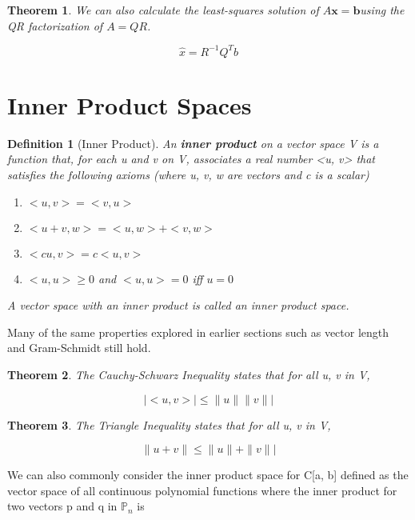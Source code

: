 \documentclass[12pt]{report}
\newtheorem{thm}{Theorem}
\newtheorem{dfn}{Definition}
\newcommand{\mateq}{$A\bm{x}=\bm{b}$}
\begin{document}
\begin{thm}
We can also calculate the least-squares solution of \mateq using the QR factorization of $A=QR$.

\begin{equation}
\hat{x} = R^{-1}Q^Tb
\end{equation}

\end{thm}

\section{Inner Product Spaces}

\begin{dfn}[Inner Product]
An \textbf{inner product} on a vector space V is a function that, for each u and v on V, associates a real number <u, v> that satisfies the following axioms (where u, v, w are vectors and c is a scalar)
\begin{enumerate}
\item $<u, v>=<v, u>$
\item $<u+v, w> = <u, w> + <v, w>$
\item $<cu, v> = c<u, v>$
\item $<u, u> \geq 0$ and $<u, u> = 0 $ iff $u=0$
\end{enumerate}
A vector space with an inner product is called an inner product space.
\end{dfn}

Many of the same properties explored in earlier sections such as vector length and Gram-Schmidt still hold.

\begin{thm}
The Cauchy-Schwarz Inequality states that for all u, v in V,

\begin{equation}
|<u, v>| \leq \|u\| \|v\||
\end{equation}

\end{thm}

\begin{thm}
The Triangle Inequality states that for all u, v in V,

\begin{equation}
\|u+v\| \leq \|u\| + \|v\||
\end{equation}

\end{thm}

We can also commonly consider the inner product space for C[a, b] defined as the vector space of all continuous polynomial functions where the inner product for two vectors p and q in $\mathbb{P}_n$ is
\end{document}
